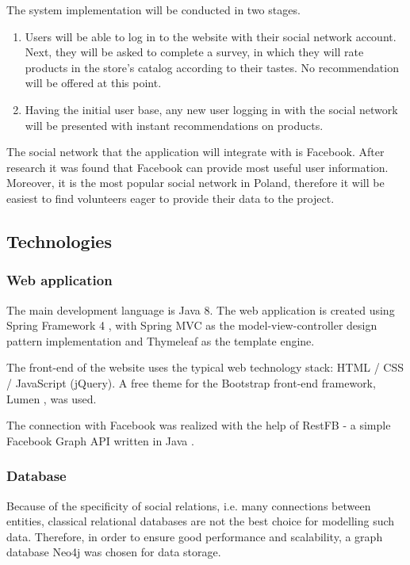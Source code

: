 \documentclass[12pt]{report}
\begin{document}
The system implementation will be conducted in two stages.
\begin{enumerate}
\item Users will be able to log in to the website with their social network account. Next, they will be asked to complete a survey, in which they will rate products in the store's catalog according to their tastes. No recommendation will be offered at this point.
\item Having the initial user base, any new user logging in with the social network will be presented with instant recommendations on products.
\end{enumerate}

The social network that the application will integrate with is Facebook. After research it was found that Facebook can provide most useful user information. Moreover, it is the most popular social network in Poland, therefore it will be easiest to find volunteers eager to provide their data to the project.

\subsection{Technologies}
\subsubsection{Web application}
The main development language is Java 8. The web application is created using Spring Framework 4 \cite{spring_framework}, with Spring MVC as the model-view-controller design pattern implementation and Thymeleaf as the template engine. 

The front-end of the website uses the typical web technology stack: HTML / CSS / JavaScript (jQuery). A free theme for the Bootstrap front-end framework, Lumen \cite{lumen}, was used.

The connection with Facebook was realized with the help of RestFB - a simple Facebook Graph API written in Java \cite{restfb}.

\subsubsection{Database}

Because of the specificity of social relations, i.e. many connections between entities, classical relational databases are not the best choice for modelling such data. Therefore, in order to ensure good performance and scalability, a graph database Neo4j \cite{neo4j} was chosen for data storage.
\end{document}
